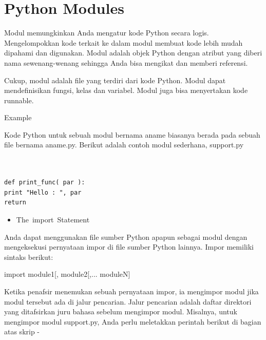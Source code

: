 
\section {Python Modules}

\vspace{\baselineskip}
\noindent Modul memungkinkan Anda mengatur kode Python secara logis. Mengelompokkan kode terkait ke dalam modul membuat kode lebih mudah dipahami dan digunakan. Modul adalah objek Python dengan atribut yang diberi nama sewenang-wenang sehingga Anda bisa mengikat dan memberi referensi.\par
\vspace{\baselineskip}
\noindent Cukup, modul adalah file yang terdiri dari kode Python. Modul dapat mendefinisikan fungsi, kelas dan variabel. Modul juga bisa menyertakan kode runnable.\par


\vspace{\baselineskip}
\noindent Example\par
\vspace{\baselineskip}
\noindent Kode Python untuk sebuah modul bernama aname biasanya berada pada sebuah file bernama aname.py. Berikut adalah contoh modul sederhana, support.py\par

\vspace{\baselineskip}
\begin{verbatim}


def print_func( par ):
print "Hello : ", par
return

\end{verbatim}

\begin{itemize}
	\item The import Statement
\end{itemize}
\noindent Anda dapat menggunakan file sumber Python apapun sebagai modul dengan mengeksekusi pernyataan impor di file sumber Python lainnya. Impor memiliki sintaks berikut:\par


\vspace{\baselineskip}
\noindent import module1[, module2[,... moduleN]\par


\vspace{\baselineskip}
\noindent Ketika penafsir menemukan sebuah pernyataan impor, ia mengimpor modul jika modul tersebut ada di jalur pencarian. Jalur pencarian adalah daftar direktori yang ditafsirkan juru bahasa sebelum mengimpor modul. Misalnya, untuk mengimpor modul support.py, Anda perlu meletakkan perintah berikut di bagian atas skrip -\par

